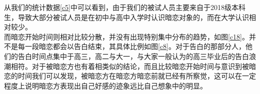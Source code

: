 \documentclass[10pt, a4paper, twocolumn]{ctexart}
\begin{document}
从我们的统计数据\ref{c5}中可以看到，由于我们的被试人员主要来自于2018级本科生，导致大部分被试人员是在初中与高中入学时认识暗恋对象的，而在大学认识相对较少。\\
\indent 而暗恋开始时间则相对比较分散，并没有出现特别集中分布的趋势，如图\ref{c18}。并不是每一段暗恋都会以告白结束，其具体比例如图\ref{c8}。对于告白的那部分人，他们的告白时间点集中于高三，高二与大一，与大家一般认为的高三毕业后的告白浪潮相符。对于被暗恋方也有着相类似的结论，而且比较暗恋开始时间与意识到被暗恋的时间我们可以发现，被暗恋方在暗恋方暗恋前就已经有所察觉，这可以在一定程度上说明暗恋方表现出自己好感的迹象远比自己想象中的明显。\\

\begin{figure}[htbp]
	\quad
	\quad
	\subfigure[告白时间分布图] {
	\centering
	\label{c8}
}
\end{figure}
\end{document}
